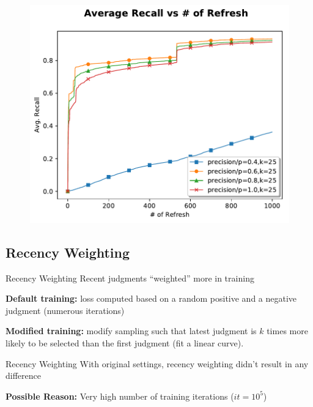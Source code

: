 \documentclass{beamer}
\begin{document}
\begin{frame}
\begin{figure}
 \centering 
 \includegraphics[width=1.0\textwidth]{prec2.pdf}
\end{figure}
\end{frame}


\subsection{Recency Weighting}
\begin{frame}{Recency Weighting}
Recent judgments ``weighted'' more in training
\vskip 1cm

\textbf{Default training:} loss computed based on a random positive and a negative judgment (numerous iterations)

\vskip 0.5cm
\textbf{Modified training:} modify sampling such that latest judgment is $k$ times more likely to be selected than the first judgment (fit a linear curve).
\end{frame}


\begin{frame}{Recency Weighting}
With original settings, recency weighting didn't result in any difference

\vskip 1cm
\textbf{Possible Reason:} Very high number of training iterations ($it = 10^5$)
\end{frame}
\end{document}
